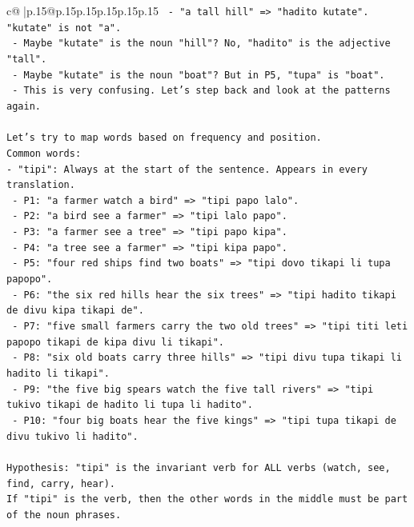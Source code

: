\documentclass{article}
\begin{document}
{\begin{supertabular}{c@{$\;$}|p{.15\linewidth}@{}p{.15\linewidth}p{.15\linewidth}p{.15\linewidth}p{.15\linewidth}p{.15\linewidth}}
{{{\texttt{                              {-} "a tall hill" => "hadito kutate". "kutate" is not "a".} \\
\texttt{                              {-} Maybe "kutate" is the noun "hill"? No, "hadito" is the adjective "tall".} \\
\texttt{                              {-} Maybe "kutate" is the noun "boat"? But in P5, "tupa" is "boat".} \\
\texttt{                              {-} This is very confusing. Let's step back and look at the patterns again.} \\
\\ 
\texttt{Let's try to map words based on frequency and position.} \\
\texttt{Common words:} \\
\texttt{{-} "tipi": Always at the start of the sentence. Appears in every translation.} \\
\texttt{  {-} P1: "a farmer watch a bird" => "tipi papo lalo".} \\
\texttt{  {-} P2: "a bird see a farmer" => "tipi lalo papo".} \\
\texttt{  {-} P3: "a farmer see a tree" => "tipi papo kipa".} \\
\texttt{  {-} P4: "a tree see a farmer" => "tipi kipa papo".} \\
\texttt{  {-} P5: "four red ships find two boats" => "tipi dovo tikapi li tupa papopo".} \\
\texttt{  {-} P6: "the six red hills hear the six trees" => "tipi hadito tikapi de divu kipa tikapi de".} \\
\texttt{  {-} P7: "five small farmers carry the two old trees" => "tipi titi leti papopo tikapi de kipa divu li tikapi".} \\
\texttt{  {-} P8: "six old boats carry three hills" => "tipi divu tupa tikapi li hadito li tikapi".} \\
\texttt{  {-} P9: "the five big spears watch the five tall rivers" => "tipi tukivo tikapi de hadito li tupa li hadito".} \\
\texttt{  {-} P10: "four big boats hear the five kings" => "tipi tupa tikapi de divu tukivo li hadito".} \\
\\ 
\texttt{Hypothesis: "tipi" is the invariant verb for ALL verbs (watch, see, find, carry, hear).} \\
\texttt{If "tipi" is the verb, then the other words in the middle must be part of the noun phrases.} \\
}}}
\end{supertabular}}
\end{document}

